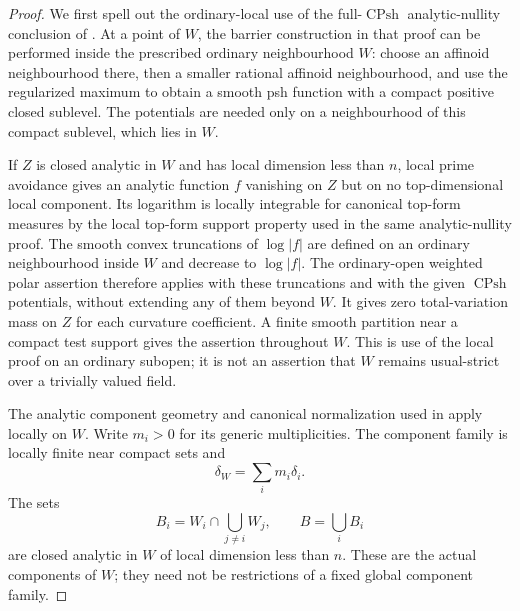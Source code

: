 \begin{proof}
We first spell out the ordinary-local use of the full-$\operatorname{CPsh}$
analytic-nullity conclusion of
.
At a point of $W$, the barrier construction in that proof can be
performed inside the prescribed ordinary neighbourhood $W$:
choose an affinoid neighbourhood there, then a smaller rational
affinoid neighbourhood, and use the regularized maximum to obtain a
smooth psh function with a compact positive closed sublevel.
The potentials are needed only on a neighbourhood of this compact
sublevel, which lies in $W$.

If $Z$ is closed analytic in $W$ and has local dimension less than $n$,
local prime avoidance gives an analytic function $f$ vanishing on $Z$
but on no top-dimensional local component.  Its logarithm is locally
integrable for canonical top-form measures by the local top-form
support property used in the same analytic-nullity proof.
The smooth convex truncations of $\log|f|$ are defined on an ordinary
neighbourhood inside $W$ and decrease to $\log|f|$.
The ordinary-open weighted polar assertion therefore applies with
these truncations and with the given $\operatorname{CPsh}$ potentials,
without extending any of them beyond $W$.
It gives zero total-variation mass on $Z$ for each curvature coefficient.
A finite smooth partition near a compact test support gives the
assertion throughout $W$.
This is use of the local proof on an ordinary subopen; it is not an
assertion that $W$ remains usual-strict over a trivially valued field.

The analytic component geometry and canonical normalization used in
 apply locally on $W$.
Write $m_i>0$ for its generic multiplicities.  The component family is
locally finite near compact sets and
\[
                 \delta_W=\sum_i m_i\delta_i .
\]
The sets
\[
 B_i=W_i\cap\bigcup_{j\ne i}W_j,
 \qquad B=\bigcup_iB_i
\]
are closed analytic in $W$ of local dimension less than $n$.
These are the actual components of $W$; they need not be restrictions
of a fixed global component family.


\end{proof}
